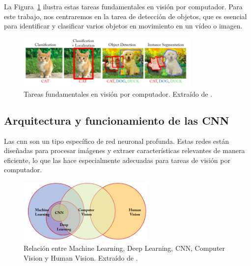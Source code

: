\documentclass[11pt,spanish,listoffigures,listoftables]{tfgetsinf}
\begin{document}
La Figura~\ref{fig:tareas_vision_por_computador} ilustra estas tareas fundamentales en visión por computador. Para este trabajo, nos centraremos en la tarea de detección de objetos, que es esencial para identificar y clasificar varios objetos en movimiento en un vídeo o imagen.

\begin{figure}[H]
   \centering
   \includegraphics[width=0.8\textwidth]{images/estado_del_arte/diferentes_formas_de_detectar.png}
   \caption[Tareas fundamentales en visión por computador]{Tareas fundamentales en visión por computador. Extraído de \cite[fig. 1.1, p. ~2]{khan2018guide}.}
   \label{fig:tareas_vision_por_computador}
\end{figure}

\subsection{Arquitectura y funcionamiento de las CNN} \label{sec:arquitectura_cnn}
Las \gls{cnn} son un tipo específico de red neuronal profunda. Estas redes están diseñadas para procesar imágenes y extraer características relevantes de manera eficiente, lo que las hace especialmente adecuadas para tareas de visión por computador.

\begin{figure}[H]
   \centering
   \includegraphics[width=0.6\textwidth]{images/estado_del_arte/diagrama_de_Venn_inteligencia_artificial.png}
   \caption[Relación entre Machine Learning, Deep Learning, CNN, Computer Vision y Human Vision]{Relación entre Machine Learning, Deep Learning, CNN, Computer Vision y Human Vision. Extraído de \cite[fig. 1.3, p. ~7]{khan2018guide}.}
   \label{fig:diagrama_de_Venn_inteligencia_artificial}
\end{figure}
\end{document}
